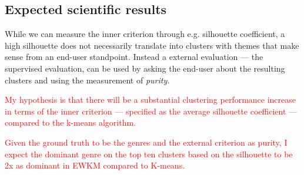 \documentclass[a4paper,11pt]{article}
\begin{document}


\subsection{Expected scientific results}

While we can measure the inner
criterion through e.g. silhouette coefficient, a high silhouette does not
necessarily translate into clusters with themes that make sense from an
end-user standpoint. Instead a external evaluation --- the supervised evaluation, can be used by asking the
end-user about the resulting clusters and using the measurement of
\textit{purity.}

\textcolor{red}{
My hypothesis is that there will be a substantial clustering performance increase in terms of the inner criterion --- specified as the average silhouette coefficient --- compared to the k-means algorithm.}


\textcolor{red}{
  Given the ground truth to be the genres and the external criterion as purity, I expect the dominant genre on the top ten clusters based on the silhouette to be 2x as dominant in EWKM compared to K-means.
}
\end{document}
